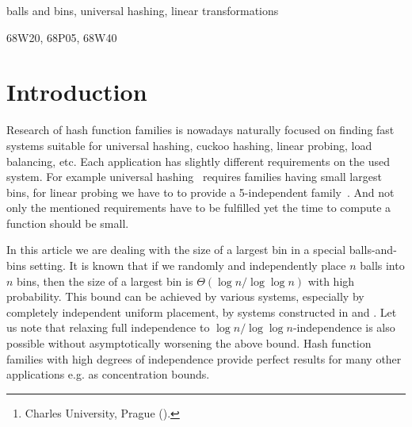 \documentclass[unicode,review]{siamart1116}
\title{\TheTitle}
\author{
  Martin Babka\thanks{Charles University, Prague (\email{babkys@gmail.com}).}
}
\newcommand{\vecspace}[2]{\mathbb{Z}_{#1}^{#2}}
\newcommand{\binvecspace}[1]{\vecspace{2}{#1}}
\numberwithin{theorem}{section}
\begin{document}
\maketitle

\begin{abstract}
We are studying placement of $n$ balls into $n$ bins where balls and bins are represented as two vector spaces over $\binvecspace{2}$. The placements is done according a linear transformation between the two vector spaces.
We analyze the expected size of the largest bin. The only currently known upper bound is is $O(\log n \log \log n)$ by Alon et al. and holds for placing $n \log n$ balls into $n$ bins.
We show that this bound can be improved to $O(\log n)$ in the case when $n$ balls are placed into $n$ bins.
We reuse the same technique as it is in the article by Alon et al. but switch to a different parametrization of the building blocks.
\end{abstract}

\begin{keywords}
balls and bins, universal hashing, linear transformations
\end{keywords}

\begin{AMS}
  68W20, %
  68P05, %
  68W40  %
\end{AMS}

\section{Introduction}

Research of hash function families is nowadays naturally focused on finding fast systems suitable for universal hashing, cuckoo hashing, linear probing, load balancing, etc.
Each application has slightly different requirements on the used system.
For example universal hashing~\cite{cw} requires families having small largest bins, for linear probing we have to to provide a 5-independent family~\cite{linear-probing}.
And not only the mentioned requirements have to be fulfilled yet the time to compute a function should be small.

In this article we are dealing with the size of a largest bin in a special balls-and-bins setting.
It is known that if we randomly and independently place $n$ balls into $n$ bins, then the size of a largest bin is $\Theta(\log n/\log \log n)$ with high probability.
This bound can be achieved by various systems, especially by completely independent uniform placement, by systems constructed in \cite{siegel} and \cite{celisetal}. 
Let us note that relaxing full independence to $\log n/\log \log n$-independence is also possible without asymptotically worsening the above bound.
Hash function families with high degrees of independence provide perfect results for many other applications e.g. as concentration bounds.
\end{document}
